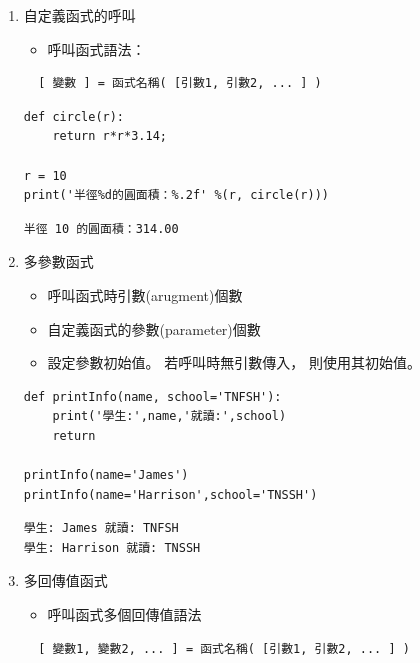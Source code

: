 \documentclass[a4paper,12pt]{article}
\begin{document}
\begin{enumerate}
\item 自定義函式的呼叫
\label{sec:orgcb3a87b}
\begin{itemize}
\item 呼叫函式語法：\\
\end{itemize}
\lstset{breaklines=true,language=Python,label= ,caption= ,captionpos=b,firstnumber=1,numbers=left}
\begin{lstlisting}
  [ 變數 ] = 函式名稱( [引數1, 引數2, ... ] )
\end{lstlisting}
\lstset{breaklines=true,language=Python,label= ,caption= ,captionpos=b,firstnumber=1,numbers=left}
\begin{lstlisting}
def circle(r):
    return r*r*3.14;

r = 10
print('半徑%d的圓面積：%.2f' %(r, circle(r)))
\end{lstlisting}

\begin{verbatim}
半徑 10 的圓面積：314.00
\end{verbatim}

\item 多參數函式
\label{sec:org009b9c3}
\begin{itemize}
\item 呼叫函式時引數(arugment)個數\\
\item 自定義函式的參數(parameter)個數\\
\item 設定參數初始值。 若呼叫時無引數傳入， 則使用其初始值。\\
\end{itemize}
\lstset{breaklines=true,language=Python,label= ,caption= ,captionpos=b,firstnumber=1,numbers=left}
\begin{lstlisting}
def printInfo(name, school='TNFSH'):
    print('學生:',name,'就讀:',school)
    return

printInfo(name='James')
printInfo(name='Harrison',school='TNSSH')
\end{lstlisting}

\begin{verbatim}
學生: James 就讀: TNFSH
學生: Harrison 就讀: TNSSH
\end{verbatim}

\item 多回傳值函式
\label{sec:org466a5a6}
\begin{itemize}
\item 呼叫函式多個回傳值語法\\
\end{itemize}
\lstset{breaklines=true,language=Python,label= ,caption= ,captionpos=b,firstnumber=1,numbers=left}
\begin{lstlisting}
  [ 變數1, 變數2, ... ] = 函式名稱( [引數1, 引數2, ... ] )
\end{lstlisting}


\end{enumerate}
\end{document}
